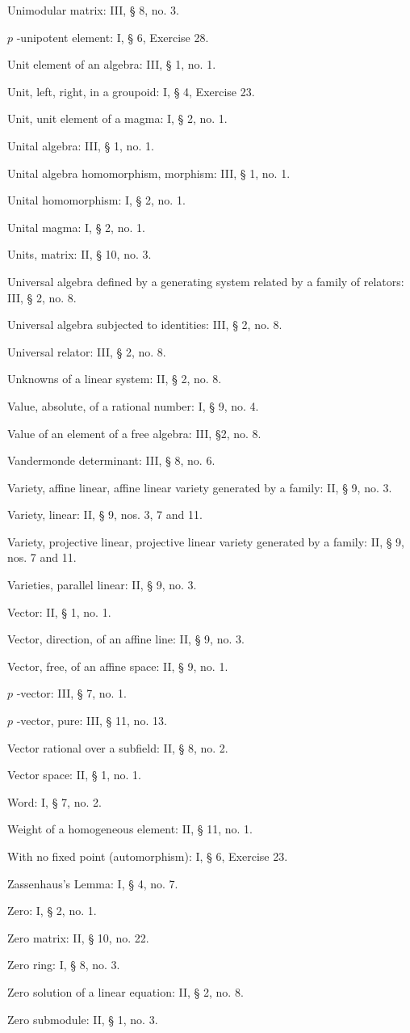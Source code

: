 Unimodular matrix: III, § 8, no. 3.

\(p\) -unipotent element: I, § 6, Exercise 28.

Unit element of an algebra: III, § 1, no. 1.

Unit, left, right, in a groupoid: I, § 4, Exercise 23.

Unit, unit element of a magma: I, § 2, no. 1.

Unital algebra: III, § 1, no. 1.

Unital algebra homomorphism, morphism: III, § 1, no. 1.

Unital homomorphism: I, § 2, no. 1.

Unital magma: I, § 2, no. 1.

Units, matrix: II, § 10, no. 3.

Universal algebra defined by a generating system related by a family of relators: III, § 2, no. 8.

Universal algebra subjected to identities: III, § 2, no. 8.

Universal relator: III, § 2, no. 8.

Unknowns of a linear system: II, § 2, no. 8.

Value, absolute, of a rational number: I, § 9, no. 4.

Value of an element of a free algebra: III, §2, no. 8.

Vandermonde determinant: III, § 8, no. 6.

Variety, affine linear, affine linear variety generated by a family: II, § 9, no. 3.

Variety, linear: II, § 9, nos. 3, 7 and 11.

Variety, projective linear, projective linear variety generated by a family: II, § 9, nos. 7 and 11.

Varieties, parallel linear: II, § 9, no. 3.

Vector: II, § 1, no. 1.

Vector, direction, of an affine line: II, § 9, no. 3.

Vector, free, of an affine space: II, § 9, no. 1.

\(p\) -vector: III, § 7, no. 1.

\(p\) -vector, pure: III, § 11, no. 13.

Vector rational over a subfield: II, § 8, no. 2.

Vector space: II, § 1, no. 1.

Word: I, § 7, no. 2.

Weight of a homogeneous element: II, § 11, no. 1.

With no fixed point (automorphism): I, § 6, Exercise 23.

Zassenhaus's Lemma: I, § 4, no. 7.

Zero: I, § 2, no. 1.

Zero matrix: II, § 10, no. 22.

Zero ring: I, § 8, no. 3.

Zero solution of a linear equation: II, § 2, no. 8.

Zero submodule: II, § 1, no. 3.

